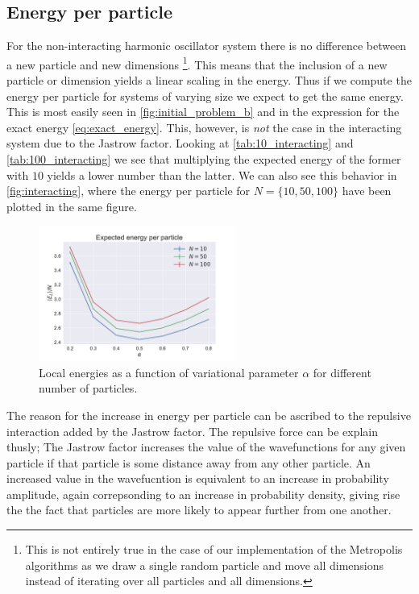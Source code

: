 \documentclass[
    a4paper, aps, twocolumn, floatfix, superscriptaddress,
    nofootinbib]{revtex4-1}
\newcommand{\1}{\mathds{1}}
\begin{document}
    \subsection{Energy per particle}
        For the non-interacting harmonic oscillator system there is no
        difference between a new particle and new dimensions
        \footnote{This is not entirely true in the case of our implementation of
        the Metropolis algorithms as we draw a single random particle and move
        all dimensions instead of iterating over all particles and all
        dimensions.}. This means that the inclusion of a new particle or
        dimension yields a linear scaling in the energy. Thus if we compute the
        energy per particle for systems of varying size we expect to get the
        same energy. This is most easily seen in \autoref{fig:initial_problem_b}
        and in the expression for the exact energy \autoref{eq:exact_energy}.
        This, however, is \emph{not} the case in the interacting system due to
        the Jastrow factor. Looking at \autoref{tab:10_interacting} and
        \autoref{tab:100_interacting} we see that multiplying the expected
        energy of the former with $10$ yields a lower number than the latter. We
        can also see this behavior in \autoref{fig:interacting}, where the
        energy per particle for $N = \{10, 50, 100\}$ have been plotted in the
        same figure.

        \begin{figure}
            \includegraphics[width=244px]{../data/figures/problem_e.pdf}
            \caption{Local energies as a function of variational parameter
            $\alpha$ for different number of particles.}
            \label{fig:interacting}
        \end{figure}

        The reason for the increase in energy per particle can be ascribed to the
        repulsive interaction added by the Jastrow factor. The repulsive force can
        be explain thusly; The Jastrow factor  increases the value of the
        wavefunctions for any given particle if that particle is some distance away
         from any other particle. An increased value in the wavefucntion is equivalent
         to an increase in probability amplitude, again correpsonding to an increase in
         probability density, giving rise the the fact that particles are more likely to
         appear further from one another.
\end{document}
